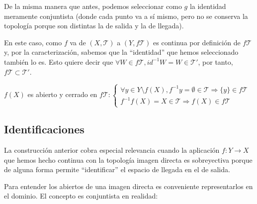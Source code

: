 \begin{demo}
\begin{itemize}
    De la misma manera que antes, podemos seleccionar como $g$ la identidad meramente conjuntista (donde cada punto va a sí mismo, pero no se conserva la topología porque son distintas la de salida y la de llegada). 
    \begin{figure}[H]
        \centering    
    \end{figure}
	En este caso, como $f$ va de $(X,\mathcal{T})$ a $(Y, f\mathcal{T})$ es continua por definición de $f\mathcal{T}$ y, por la caracterización, sabemos que la ``identidad'' que hemos seleccionado también lo es. Esto quiere decir que $\forall W \in f\mathcal{T}, id^{-1} W = W \in \mathcal{T}'$, por tanto, $f\mathcal{T}\subset \mathcal{T}'$.
\end{itemize}
\end{demo}

\begin{obs}
$f\left( X \right)$ es abierto y cerrado en $f\mathcal{T}: \begin{cases}
    \forall y \in Y \setminus f\left( X \right), f^{-1}y = \emptyset \in \mathcal{T} \Rightarrow \{y\} \in f\mathcal{T}\\
    f^{-1}f\left( X \right) = X \in \mathcal{T} \Rightarrow f\left( X \right) \in f\mathcal{T}
\end{cases}$
\end{obs}

\subsection{Identificaciones}
\label{sub:identificaciones}
La construcción anterior cobra especial relevancia cuando la aplicación $f: Y \rightarrow X$ que hemos hecho continua con la topología imagen directa es sobreyectiva porque de alguna forma permite ``identificar'' el espacio de llegada en el de salida.

Para entender los abiertos de una imagen directa es conveniente representarlos en el dominio. El concepto es conjuntista en realidad:

